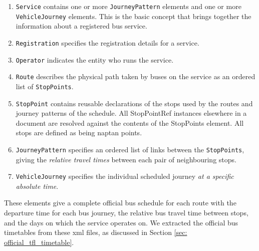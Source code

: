 \begin{enumerate}
  \item \texttt{Service} contains one or more \texttt{JourneyPattern} elements and one or more \texttt{VehicleJourney} elements. This is the basic concept that brings together the information about a registered bus service.
  \item \texttt{Registration} specifies the registration details for a service.
  \item \texttt{Operator} indicates the entity who runs the service.
  \item \texttt{Route} describes the physical path taken by buses on the service as an ordered list of \texttt{StopPoints}.
  \item \texttt{StopPoint} contains reusable declarations of the stops used by the routes and journey patterns of the schedule. All StopPointRef instances elsewhere in a document are resolved against the contents of the StopPoints element. All stops are defined as being \gls{naptan} points.
  \item \texttt{JourneyPattern} specifies an ordered list of links between the \texttt{StopPoints}, giving the \emph{relative travel times} between each pair of neighbouring stops.
  \item \texttt{VehicleJourney} specifies the individual scheduled journey \emph{at a specific absolute time}.
\end{enumerate}

These elements give a complete official bus schedule for each route with the departure time for each bus journey, the relative bus travel time between stops, and the days on which the service operates on. We extracted the official bus timetables from these \acrshort{xml} files, as discussed in Section \ref{sec: official_tfl_timetable}.
